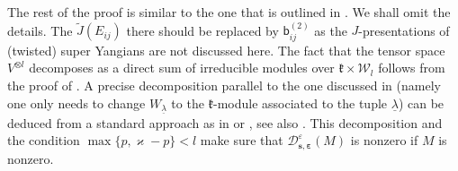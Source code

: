\documentclass[11pt,reqno]{amsart}
\numberwithin{equation}{section}
\theoremstyle{definition}
\theoremstyle{remark}
\newcommand{\mc}{\mathcal}
\newcommand{\sfb}{\mathsf{b}}
\newcommand{\la}{\lambda}
\newcommand{\ka}{\varkappa}
\newcommand{\ve}{\varepsilon}
\newcommand{\s}{{\bm s}}
\begin{document}
The rest of the proof is similar to the one that is outlined in \cite[proof of Theorem 4.3]{Chen2014twisted}. We shall omit the details. The $\widetilde J(E_{ij})$ there should be replaced by $\sfb_{ij}^{(2)}$ as the $J$-presentations of (twisted) super Yangians are not discussed here. The fact that the tensor space $V^{\otimes l}$ decomposes as a direct sum of irreducible modules over $\mathfrak k\times \mathscr W_l$ follows from the proof of \cite[Theorem 5.8]{Shen2022quantum}. A precise decomposition parallel to the one discussed in \cite[Introduction]{Ariki1995schur} (namely one only needs to change $W_{\underline{\la}}$ to the $\mathfrak k$-module associated to the tuple $\underline{\la}$) can be deduced from a standard approach as in \cite[Theorem 3.11]{Cheng2009dualities} or \cite{Ariki1995schur}, see also \cite[Chapter II]{Kerber1971reps}. This decomposition and the condition $\max\{p,\ka-p\}<l$ make sure that $\mc D^{\ve}_{\s,\bm\ve}(M)$ is nonzero if $M$ is nonzero.


















\end{document}
